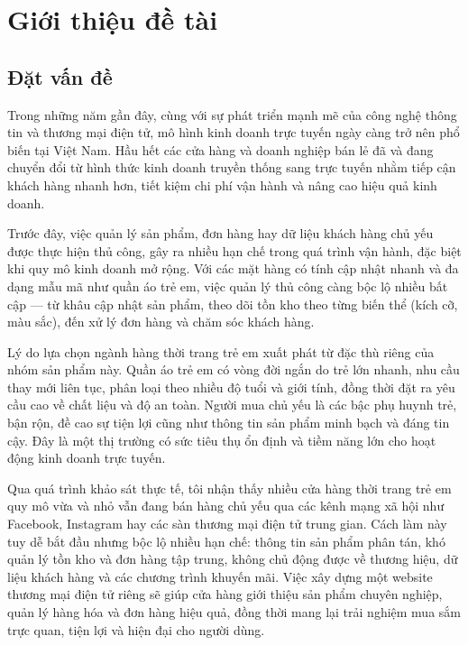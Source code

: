 \chapter{Giới thiệu đề tài}
\label{ch:intro}

\section{Đặt vấn đề}

Trong những năm gần đây, cùng với sự phát triển mạnh mẽ của công nghệ thông tin và thương
mại điện tử, mô hình kinh doanh trực tuyến ngày càng trở nên phổ biến tại Việt Nam. Hầu hết
các cửa hàng và doanh nghiệp bán lẻ đã và đang chuyển đổi từ hình thức kinh doanh truyền
thống sang trực tuyến nhằm tiếp cận khách hàng nhanh hơn, tiết kiệm chi phí vận hành và nâng
cao hiệu quả kinh doanh.

Trước đây, việc quản lý sản phẩm, đơn hàng hay dữ liệu khách hàng chủ yếu được thực hiện
thủ công, gây ra nhiều hạn chế trong quá trình vận hành, đặc biệt khi quy mô kinh doanh mở
rộng. Với các mặt hàng có tính cập nhật nhanh và đa dạng mẫu mã như quần áo trẻ em, việc
quản lý thủ công càng bộc lộ nhiều bất cập --- từ khâu cập nhật sản phẩm, theo dõi tồn kho
theo từng biến thể (kích cỡ, màu sắc), đến xử lý đơn hàng và chăm sóc khách hàng.

Lý do lựa chọn ngành hàng thời trang trẻ em xuất phát từ đặc thù riêng của nhóm sản phẩm này.
Quần áo trẻ em có vòng đời ngắn do trẻ lớn nhanh, nhu cầu thay mới liên tục, phân loại theo
nhiều độ tuổi và giới tính, đồng thời đặt ra yêu cầu cao về chất liệu và độ an toàn. Người mua
chủ yếu là các bậc phụ huynh trẻ, bận rộn, đề cao sự tiện lợi cũng như thông tin sản phẩm minh
bạch và đáng tin cậy. Đây là một thị trường có sức tiêu thụ ổn định và tiềm năng lớn cho hoạt
động kinh doanh trực tuyến.

Qua quá trình khảo sát thực tế, tôi nhận thấy nhiều cửa hàng thời trang trẻ em quy mô vừa và
nhỏ vẫn đang bán hàng chủ yếu qua các kênh mạng xã hội như Facebook, Instagram hay các sàn
thương mại điện tử trung gian. Cách làm này tuy dễ bắt đầu nhưng bộc lộ nhiều hạn chế: thông
tin sản phẩm phân tán, khó quản lý tồn kho và đơn hàng tập trung, không chủ động được về
thương hiệu, dữ liệu khách hàng và các chương trình khuyến mãi. Việc xây dựng một website
thương mại điện tử riêng sẽ giúp cửa hàng giới thiệu sản phẩm chuyên nghiệp, quản lý hàng hóa
và đơn hàng hiệu quả, đồng thời mang lại trải nghiệm mua sắm trực quan, tiện lợi và hiện đại
cho người dùng.

